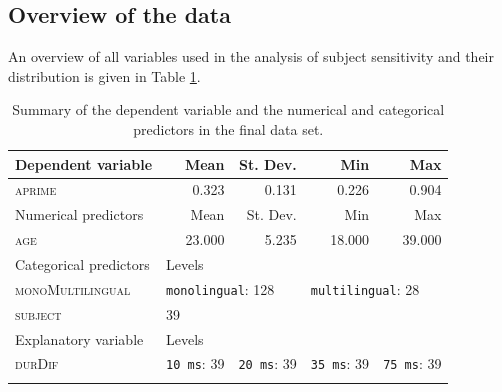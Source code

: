 \subsection{Overview of the data}\label{section06_2_2}

An overview of all variables used in the analysis of subject sensitivity and their distribution is given in Table \ref{tab:6.10}.

\begin{table}\fontsize{10}{11}
\caption{Summary of the dependent variable and the numerical and categorical predictors in the final data set.}
\label{tab:6.10}
\centering
\begin{tabular}{lllll} 
\lsptoprule
Dependent variable     & \multicolumn{1}{r}{Mean}        & \multicolumn{1}{r}{St. Dev.}                 & \multicolumn{1}{r}{Min}         & \multicolumn{1}{r}{Max}                       \\ 
\midrule
\textsc{aprime}                 & \multicolumn{1}{r}{0.323}       & \multicolumn{1}{r}{0.131}                    & \multicolumn{1}{r}{0.226}       & \multicolumn{1}{r}{0.904}                     \\ 
\midrule
Numerical predictors   & \multicolumn{1}{r}{Mean}        & \multicolumn{1}{r}{St. Dev.}                 & \multicolumn{1}{r}{Min}         & \multicolumn{1}{r}{Max}                       \\ 
\midrule
\textsc{age}                    & \multicolumn{1}{r}{23.000}      & \multicolumn{1}{r}{5.235}                    & \multicolumn{1}{r}{18.000}      & \multicolumn{1}{r}{39.000}                    \\ 
\midrule
Categorical predictors & Levels      & ~                        & ~           & ~                         \\ 
\midrule
\textsc{monoMultilingual}       & \multicolumn{2}{l}{\texttt{monolingual}:
  128} & \multicolumn{2}{l}{\texttt{multilingual}:
  28}  \\
\textsc{subject}                & 39          & ~                        & ~           & ~                         \\ 
\midrule
Explanatory variable   & Levels      & ~                        & ~           & ~                         \\ 
\midrule
\textsc{durDif}                 & \texttt{10 ms}:
  39 & \texttt{20 ms}:
  39              & \texttt{35 ms}:
  39 & \texttt{75 ms}:
  39               \\
\lspbottomrule
\end{tabular}
\end{table}

